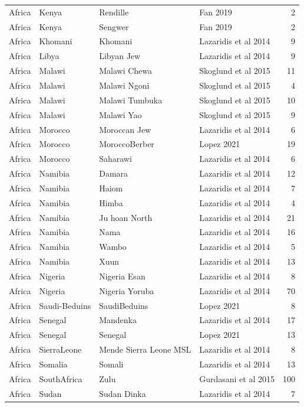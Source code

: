 \begin{longtable}[t]{lll>{\raggedright\arraybackslash}p{9em}r}
Africa & Kenya & Rendille & Fan 2019 & 2\\
Africa & Kenya & Sengwer & Fan 2019 & 2\\
Africa & Khomani & Khomani & Lazaridis et al 2014 & 9\\
\addlinespace
Africa & Libya & Libyan Jew & Lazaridis et al 2014 & 9\\
Africa & Malawi & Malawi Chewa & Skoglund et al 2015 & 11\\
Africa & Malawi & Malawi Ngoni & Skoglund et al 2015 & 4\\
Africa & Malawi & Malawi Tumbuka & Skoglund et al 2015 & 10\\
Africa & Malawi & Malawi Yao & Skoglund et al 2015 & 9\\
\addlinespace
Africa & Morocco & Moroccan Jew & Lazaridis et al 2014 & 6\\
Africa & Morocco & MoroccoBerber & Lopez 2021 & 19\\
Africa & Morocco & Saharawi & Lazaridis et al 2014 & 6\\
Africa & Namibia & Damara & Lazaridis et al 2014 & 12\\
Africa & Namibia & Haiom & Lazaridis et al 2014 & 7\\
\addlinespace
Africa & Namibia & Himba & Lazaridis et al 2014 & 4\\
Africa & Namibia & Ju hoan North & Lazaridis et al 2014 & 21\\
Africa & Namibia & Nama & Lazaridis et al 2014 & 16\\
Africa & Namibia & Wambo & Lazaridis et al 2014 & 5\\
Africa & Namibia & Xuun & Lazaridis et al 2014 & 13\\
\addlinespace
Africa & Nigeria & Nigeria Esan & Lazaridis et al 2014 & 8\\
Africa & Nigeria & Nigeria Yoruba & Lazaridis et al 2014 & 70\\
Africa & Saudi-Beduins & SaudiBeduins & Lopez 2021 & 8\\
Africa & Senegal & Mandenka & Lazaridis et al 2014 & 17\\
Africa & Senegal & Senegal & Lopez 2021 & 13\\
\addlinespace
Africa & SierraLeone & Mende Sierra Leone MSL & Lazaridis et al 2014 & 8\\
Africa & Somalia & Somali & Lazaridis et al 2014 & 13\\
Africa & SouthAfrica & Zulu & Gurdasani et al 2015 & 100\\
Africa & Sudan & Sudan Dinka & Lazaridis et al 2014 & 7\\

\end{longtable}

